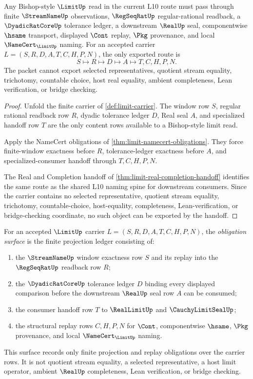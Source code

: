 \begin{theorem}
\label{thm:limit-regseqrat-bishop-handoff}
Any Bishop-style $\LimitUp$ read in the current L10 route must pass through finite $\StreamNameUp$ observations, $\RegSeqRatUp$ regular-rational readback, a $\DyadicRatCoreUp$ tolerance ledger, a downstream $\RealUp$ seal, componentwise $\hsame$ transport, displayed $\Cont$ replay, $\Pkg$ provenance, and local $\NameCert_{\LimitUp}$ naming. For an accepted carrier $L=(S,R,D,A,T,C,H,P,N)$, the only exported route is
$$
S \longmapsto R \longmapsto D \longmapsto A \longmapsto T,C,H,P,N .
$$
The packet cannot export selected representatives, quotient stream equality, trichotomy, countable choice, host real equality, ambient completeness, Lean verification, or bridge checking.
\end{theorem}
\begin{proof}
Unfold the finite carrier of \autoref{def:limit-carrier}. The window row $S$, regular rational readback row $R$, dyadic tolerance ledger $D$, Real seal $A$, and specialized handoff row $T$ are the only content rows available to a Bishop-style limit read.

Apply the NameCert obligations of \autoref{thm:limit-namecert-obligations}. They force finite-window exactness before $R$, tolerance-ledger exactness before $A$, and specialized-consumer handoff through $T,C,H,P,N$.

The Real and Completion handoff of \autoref{thm:limit-real-completion-handoff} identifies the same route as the shared L10 naming spine for downstream consumers. Since the carrier contains no selected representative, quotient stream equality, trichotomy, countable-choice, host-equality, completeness, Lean-verification, or bridge-checking coordinate, no such object can be exported by the handoff.
\end{proof}

\begin{definition}
\label{def:limit-obligation-surface}
For an accepted $\LimitUp$ carrier $L=(S,R,D,A,T,C,H,P,N)$, the \emph{obligation surface} is the finite projection ledger consisting of:
\begin{enumerate}
\item the $\StreamNameUp$ window exactness row $S$ and its replay into the $\RegSeqRatUp$ readback row $R$;
\item the $\DyadicRatCoreUp$ tolerance ledger $D$ binding every displayed comparison before the downstream $\RealUp$ seal row $A$ can be consumed;
\item the consumer handoff row $T$ to $\RealLimitUp$ and $\CauchyLimitSealUp$;
\item the structural replay rows $C,H,P,N$ for $\Cont$, componentwise $\hsame$, $\Pkg$ provenance, and local $\NameCert_{\LimitUp}$ naming.
\end{enumerate}
This surface records only finite projection and replay obligations over the carrier rows. It is not quotient stream equality, a selected representative, a host limit operator, ambient $\RealUp$ completeness, Lean verification, or bridge checking.
\end{definition}

